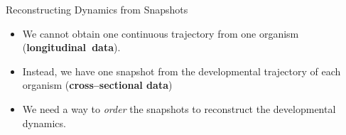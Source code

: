 \begin{frame}{Reconstructing Dynamics from Snapshots}

{\small
\begin{itemize}
\item We cannot obtain one continuous trajectory from one organism ({\bf longitudinal~data}).
%
\item Instead, we have one snapshot from the developmental trajectory of each organism ({\bf cross--sectional data})
%
\item We need a way to {\em order} the snapshots  to reconstruct the developmental dynamics.
\end{itemize}
}
\end{frame}

